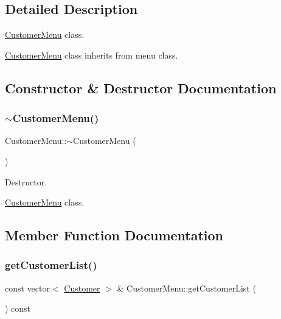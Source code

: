 \subsection{Detailed Description}
\hyperlink{classCustomerMenu}{Customer\+Menu} class. 

\hyperlink{classCustomerMenu}{Customer\+Menu} class inherits from menu class. 

\subsection{Constructor \& Destructor Documentation}
\mbox{\label{classCustomerMenu_aa28a689d645c7df53e2d714195fcf08e}} 
\subsubsection{\texorpdfstring{$\sim$\+Customer\+Menu()}{~CustomerMenu()}}
{\footnotesize\ttfamily Customer\+Menu\+::$\sim$\+Customer\+Menu (\begin{DoxyParamCaption}{ }\end{DoxyParamCaption})}



Destructor. 

\hyperlink{classCustomerMenu}{Customer\+Menu} class. 

\subsection{Member Function Documentation}
\mbox{\label{classCustomerMenu_a633a6392060ef6e6bdb94ea6d554429c}} 
\subsubsection{\texorpdfstring{get\+Customer\+List()}{getCustomerList()}}
{\footnotesize\ttfamily const vector$<$ \hyperlink{classCustomer}{Customer} $>$ \& Customer\+Menu\+::get\+Customer\+List (\begin{DoxyParamCaption}{ }\end{DoxyParamCaption}) const}



